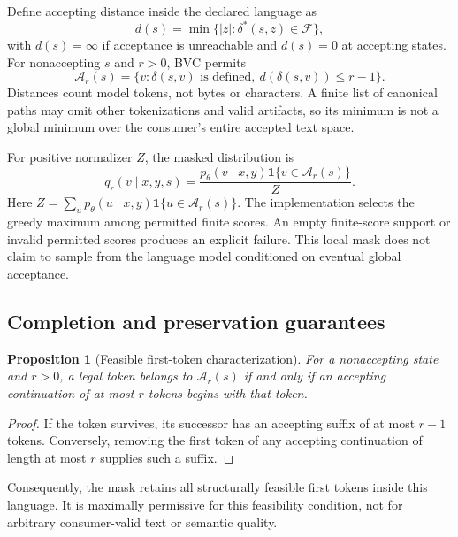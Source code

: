 \documentclass[12pt,a4paper]{article}
\newtheorem{proposition}{Proposition}
\begin{document}
Define accepting distance inside the declared language as
\begin{equation}
d(s)=\min\{|z|:\delta^*(s,z)\in\mathcal F\},\label{eq:distance}
\end{equation}
with $d(s)=\infty$ if acceptance is unreachable and $d(s)=0$ at accepting states. For nonaccepting $s$ and $r>0$, BVC permits
\begin{equation}
\mathcal A_r(s)=\{v:\delta(s,v)\text{ is defined},\ d(\delta(s,v))\le r-1\}.\label{eq:mask}
\end{equation}
Distances count model tokens, not bytes or characters. A finite list of canonical paths may omit other tokenizations and valid artifacts, so its minimum is not a global minimum over the consumer's entire accepted text space.

For positive normalizer $Z$, the masked distribution is
\begin{equation}
q_r(v\mid x,y,s)=\frac{p_\theta(v\mid x,y)\mathbf1\{v\in\mathcal A_r(s)\}}{Z}.
\end{equation}
Here $Z=\sum_u p_\theta(u\mid x,y)\mathbf1\{u\in\mathcal A_r(s)\}$. The implementation selects the greedy maximum among permitted finite scores. An empty finite-score support or invalid permitted scores produces an explicit failure. This local mask does not claim to sample from the language model conditioned on eventual global acceptance.

\subsection{Completion and preservation guarantees}\label{sec:guarantees}
\begin{proposition}[Feasible first-token characterization]\label{prop:support}
For a nonaccepting state and $r>0$, a legal token belongs to $\mathcal A_r(s)$ if and only if an accepting continuation of at most $r$ tokens begins with that token.
\end{proposition}
\begin{proof}
If the token survives, its successor has an accepting suffix of at most $r-1$ tokens. Conversely, removing the first token of any accepting continuation of length at most $r$ supplies such a suffix.
\end{proof}
Consequently, the mask retains all structurally feasible first tokens inside this language. It is maximally permissive for this feasibility condition, not for arbitrary consumer-valid text or semantic quality.
\end{document}
